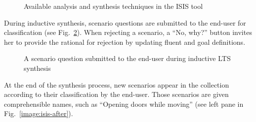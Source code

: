 \begin{figure}
\centering{}
  \caption{Available analysis and synthesis techniques in the ISIS tool\label{image:isis-tool-context}}
\end{figure}

During inductive synthesis, scenario questions are submitted to the end-user for classification (see Fig.~\ref{image:isis-tool-scenario-question}). When rejecting a scenario, a ``No, why?'' button invites her to provide the rational for rejection by updating fluent and goal definitions. 

\begin{figure}
\centering{}
  \caption{A scenario question submitted to the end-user during inductive LTS synthesis\label{image:isis-tool-scenario-question}}
\end{figure}

At the end of the synthesis process, new scenarios appear in the collection according to their classification by the end-user. Those scenarios are given comprehensible names, such as ``Opening doors while moving'' (see left pane in Fig.~\ref{image:isis-after}).


